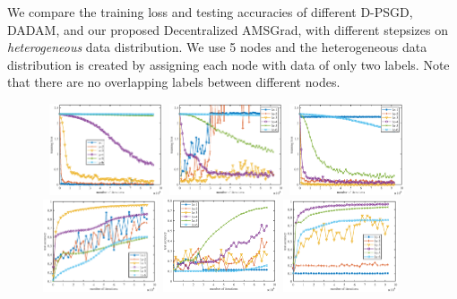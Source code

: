 \documentclass[anon,12pt]{colt2021} %
\begin{document}
We compare the training loss and testing accuracies of different D-PSGD, DADAM, and our proposed Decentralized AMSGrad,  with different stepsizes on \emph{heterogeneous} data distribution. 
We use 5 nodes and the heterogeneous data distribution is created by assigning each node with data of only two labels.
Note that there are no overlapping labels between different nodes. 
\vspace{-0.1in}
\begin{figure}[H]
    \begin{center}
\mbox{
	\includegraphics[width=0.3\textwidth]{figures/sgd_train.eps}
	\includegraphics[width=0.3\textwidth]{figures/adam_train.eps}
	\includegraphics[width=0.3\textwidth]{figures/amsgrad_train.eps}
        }
\mbox{
         \includegraphics[width=0.3\textwidth]{figures/sgd_test.eps}
         \includegraphics[width=0.3\textwidth]{figures/adam_test.eps}
         \includegraphics[width=0.3\textwidth]{figures/amsgrad_test.eps}
	   }


\end{center}
\end{figure}
\end{document}
